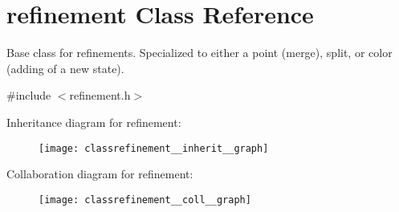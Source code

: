 \hypertarget{classrefinement}{}\section{refinement Class Reference}
\label{classrefinement}


Base class for refinements. Specialized to either a point (merge), split, or color (adding of a new state).  




{\ttfamily \#include $<$refinement.\+h$>$}



Inheritance diagram for refinement\+:
\nopagebreak
\begin{figure}[H]
\begin{center}
\leavevmode
\texttt{[image: classrefinement\_\_inherit\_\_graph]}
\end{center}
\end{figure}


Collaboration diagram for refinement\+:
\nopagebreak
\begin{figure}[H]
\begin{center}
\leavevmode
\texttt{[image: classrefinement\_\_coll\_\_graph]}
\end{center}
\end{figure}
